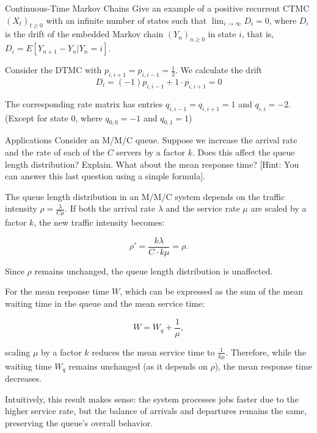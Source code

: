 \begin{problem}{Continuous-Time Markov Chains}
Give an example of a positive recurrent CTMC $(X_t)_{t\geq 0}$ with an infinite number of states such that $\lim_{i\rightarrow\infty} D_i = 0$, where $D_i$ is the drift of the embedded Markov chain $(Y_n)_{n\geq 0}$ in state $i$, that is, $D_i = E[Y_{n+1} - Y_n|Y_n = i]$.
\end{problem}

\begin{solution}
  Consider the DTMC with $p_{i,i+1}=p_{i,i-1}=\frac{1}{2}$. We calculate the drift
  \[
    D_i = (-1)p_{i,i-1} + 1\cdot p_{i,i+1} = 0
  \]

  The corresponding rate matrix has entries $q_{i,i-1} = q_{i,i+1} = 1$ and $q_{i,i} = -2$. (Except for state 0, where $q_{0,0}=-1$ and $q_{0,1}=1$)
\end{solution}

\begin{problem}{Applications}
Consider an M/M/C queue. Suppose we increase the arrival rate and the rate of each of the $C$ servers by a factor $k$. Does this affect the queue length distribution? Explain. What about the mean response time? [Hint: You can answer this last question using a simple formula].
\end{problem}
\begin{solution}
The queue length distribution in an M/M/C system depends on the traffic intensity $\rho = \frac{\lambda}{C\mu}$. If both the arrival rate $\lambda$ and the service rate $\mu$ are scaled by a factor $k$, the new traffic intensity becomes:

\[
\rho' = \frac{k\lambda}{C \cdot k\mu} = \rho.
\]

Since $\rho$ remains unchanged, the queue length distribution is unaffected.

For the mean response time $W$, which can be expressed as the sum of the mean waiting time in the queue and the mean service time:

\[
W = W_q + \frac{1}{\mu},
\]

scaling $\mu$ by a factor $k$ reduces the mean service time to $\frac{1}{k\mu}$. Therefore, while the waiting time $W_q$ remains unchanged (as it depends on $\rho$), the mean response time decreases.

Intuitively, this result makes sense: the system processes jobs faster due to the higher service rate, but the balance of arrivals and departures remains the same, preserving the queue's overall behavior.
\end{solution}

